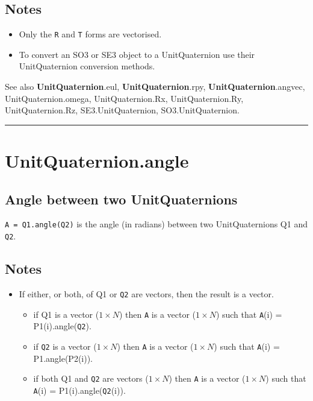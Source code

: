 \subsection*{Notes}
\begin{itemize}
  \item Only the \texttt{R} and \texttt{T} forms are vectorised.
  \item To convert an SO3 or SE3 object to a UnitQuaternion use their    UnitQuaternion conversion methods.
\end{itemize}


See also \textbf{\color{red} UnitQuaternion}.eul, \textbf{\color{red} UnitQuaternion}.rpy, \textbf{\color{red} UnitQuaternion}.angvec,
UnitQuaternion.omega, UnitQuaternion.Rx, UnitQuaternion.Ry,
UnitQuaternion.Rz, SE3.UnitQuaternion, SO3.UnitQuaternion.

\vspace{1.5ex}\hrule

\hypertarget{UnitQuaternion.angle}{\section*{UnitQuaternion.angle}}
\subsection*{Angle between two UnitQuaternions}


\texttt{A = Q1.angle(Q2)} is the angle (in radians) between two UnitQuaternions Q1 and \texttt{Q2}.


\subsection*{Notes}
\begin{itemize}
  \item If either, or both, of Q1 or \texttt{Q2} are vectors, then the result is a vector.
\begin{itemize}
  \item if Q1 is a vector ($1 \times N$) then \texttt{A} is a vector ($1 \times N$) such that \texttt{A}(i) = P1(i).angle(\texttt{Q2}).
  \item if \texttt{Q2} is a vector ($1 \times N$) then \texttt{A} is a vector ($1 \times N$) such that \texttt{A}(i) = P1.angle(P2(i)).
  \item if both Q1 and \texttt{Q2} are vectors ($1 \times N$) then \texttt{A} is a vector ($1 \times N$) such     that \texttt{A}(i) = P1(i).angle(\texttt{Q2}(i)).
\end{itemize}
\end{itemize}

